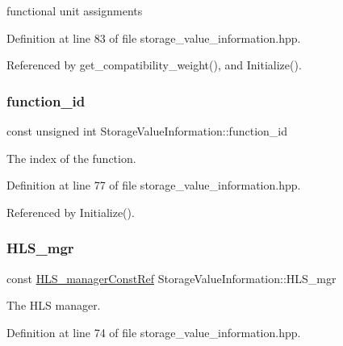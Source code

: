 functional unit assignments 



Definition at line 83 of file storage\+\_\+value\+\_\+information.\+hpp.



Referenced by get\+\_\+compatibility\+\_\+weight(), and Initialize().

\mbox{\label{classStorageValueInformation_ad5a9397ff900616471a7fed787bdce2d}} 
\subsubsection{\texorpdfstring{function\+\_\+id}{function\_id}}
{\footnotesize\ttfamily const unsigned int Storage\+Value\+Information\+::function\+\_\+id\hspace{0.3cm}{\ttfamily [protected]}}



The index of the function. 



Definition at line 77 of file storage\+\_\+value\+\_\+information.\+hpp.



Referenced by Initialize().

\mbox{\label{classStorageValueInformation_aa60471f4fd3f3c6ca9a2ec472de3de48}} 
\subsubsection{\texorpdfstring{H\+L\+S\+\_\+mgr}{HLS\_mgr}}
{\footnotesize\ttfamily const \hyperlink{hls__manager_8hpp_a1b481383e3beabc89bd7562ae672dd8c}{H\+L\+S\+\_\+manager\+Const\+Ref} Storage\+Value\+Information\+::\+H\+L\+S\+\_\+mgr\hspace{0.3cm}{\ttfamily [protected]}}



The H\+LS manager. 



Definition at line 74 of file storage\+\_\+value\+\_\+information.\+hpp.




